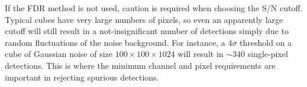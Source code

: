 If the FDR method is not used, caution is required when choosing the
S/N cutoff. Typical cubes have very large numbers of pixels, so even
an apparently large cutoff will still result in a not-insignificant
number of detections simply due to random fluctuations of the noise
background. For instance, a $4\sigma$ threshold on a cube of Gaussian
noise of size $100\times100\times1024$ will result in $\sim340$
single-pixel detections. This is where the minimum channel and pixel
requirements are important in rejecting spurious detections.


%  
%  
%  
%  
%  
%  
%  
%  
